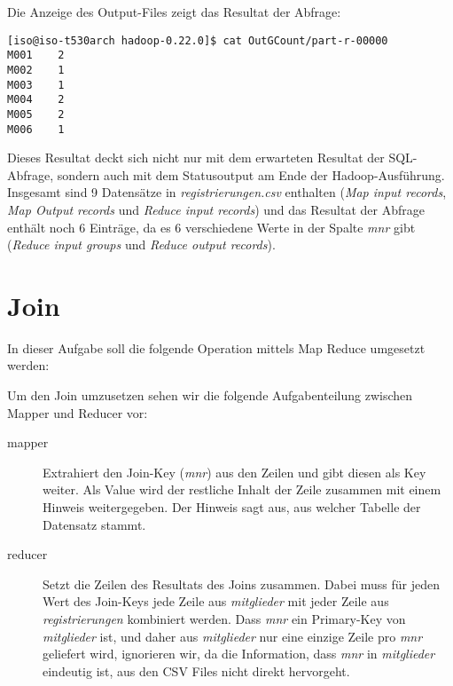 \documentclass[11pt,a4paper,parskip=half]{scrartcl}
\begin{document}
Die Anzeige des Output-Files zeigt das Resultat der Abfrage:
\begin{lstlisting}
[iso@iso-t530arch hadoop-0.22.0]$ cat OutGCount/part-r-00000 
M001	2
M002	1
M003	1
M004	2
M005	2
M006	1
\end{lstlisting}

Dieses Resultat deckt sich nicht nur mit dem erwarteten Resultat der SQL-Abfrage, sondern auch mit dem Statusoutput am Ende der Hadoop-Ausführung. Insgesamt sind 9 Datensätze in \emph{registrierungen.csv} enthalten (\emph{Map input records}, \emph{Map Output records} und \emph{Reduce input records}) und das Resultat der Abfrage enthält noch 6 Einträge, da es 6 verschiedene Werte in der Spalte \emph{mnr} gibt (\emph{Reduce input groups} und \emph{Reduce output records}).


\newpage
\section{Join}
In dieser Aufgabe soll die folgende Operation mittels Map Reduce umgesetzt werden:


Um den Join umzusetzen sehen wir die folgende Aufgabenteilung zwischen Mapper und Reducer vor:
\begin{description}
	\item[mapper]	Extrahiert den Join-Key (\emph{mnr}) aus den Zeilen und gibt diesen als Key weiter. Als Value wird der restliche Inhalt der Zeile zusammen mit einem Hinweis weitergegeben. Der Hinweis sagt aus, aus welcher Tabelle der Datensatz stammt.
	\item[reducer]	Setzt die Zeilen des Resultats des Joins zusammen. Dabei muss für jeden Wert des Join-Keys jede Zeile aus \emph{mitglieder} mit jeder Zeile aus \emph{registrierungen} kombiniert werden. Dass \emph{mnr} ein Primary-Key von \emph{mitglieder} ist, und daher aus \emph{mitglieder} nur eine einzige Zeile pro \emph{mnr} geliefert wird, ignorieren wir, da die Information, dass \emph{mnr} in \emph{mitglieder} eindeutig ist, aus den CSV Files nicht direkt hervorgeht.
\end{description}
\end{document}
